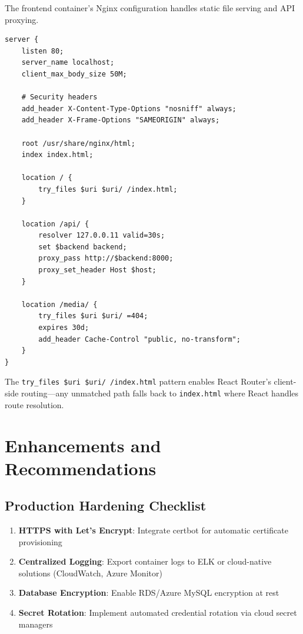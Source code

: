 The frontend container's Nginx configuration handles static file serving and API proxying.

\begin{lstlisting}[language=nginx, caption=Nginx Production Configuration (\texttt{nginx.conf})]
server {
    listen 80;
    server_name localhost;
    client_max_body_size 50M;

    # Security headers
    add_header X-Content-Type-Options "nosniff" always;
    add_header X-Frame-Options "SAMEORIGIN" always;

    root /usr/share/nginx/html;
    index index.html;

    location / {
        try_files $uri $uri/ /index.html;
    }

    location /api/ {
        resolver 127.0.0.11 valid=30s;
        set $backend backend;
        proxy_pass http://$backend:8000;
        proxy_set_header Host $host;
    }

    location /media/ {
        try_files $uri $uri/ =404;
        expires 30d;
        add_header Cache-Control "public, no-transform";
    }
}
\end{lstlisting}

The \texttt{try\_files \$uri \$uri/ /index.html} pattern enables React Router's client-side routing---any unmatched path falls back to \texttt{index.html} where React handles route resolution.

\section{Enhancements and Recommendations}
\label{sec:devops-enhancements}

\subsection{Production Hardening Checklist}

\begin{enumerate}
    \item \textbf{HTTPS with Let's Encrypt}: Integrate certbot for automatic certificate provisioning
    \item \textbf{Centralized Logging}: Export container logs to ELK or cloud-native solutions (CloudWatch, Azure Monitor)
    \item \textbf{Database Encryption}: Enable RDS/Azure MySQL encryption at rest
    \item \textbf{Secret Rotation}: Implement automated credential rotation via cloud secret managers
\end{enumerate}

